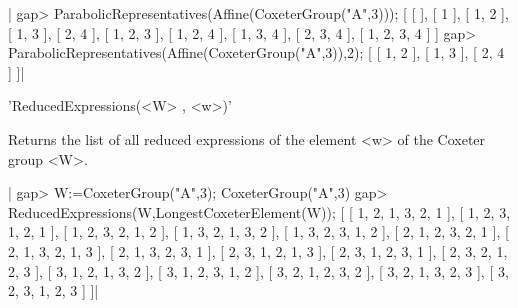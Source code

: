 |    gap> ParabolicRepresentatives(Affine(CoxeterGroup("A",3)));
    [ [  ], [ 1 ], [ 1, 2 ], [ 1, 3 ], [ 2, 4 ], [ 1, 2, 3 ],
      [ 1, 2, 4 ], [ 1, 3, 4 ], [ 2, 3, 4 ], [ 1, 2, 3, 4 ] ]
    gap> ParabolicRepresentatives(Affine(CoxeterGroup("A",3)),2);
    [ [ 1, 2 ], [ 1, 3 ], [ 2, 4 ] ]|


'ReducedExpressions(<W> , <w>)'

Returns  the list  of all  reduced expressions  of the  element <w>  of the
Coxeter group <W>.

|    gap> W:=CoxeterGroup("A",3);
    CoxeterGroup("A",3)
    gap> ReducedExpressions(W,LongestCoxeterElement(W));
    [ [ 1, 2, 1, 3, 2, 1 ], [ 1, 2, 3, 1, 2, 1 ], [ 1, 2, 3, 2, 1, 2 ],
      [ 1, 3, 2, 1, 3, 2 ], [ 1, 3, 2, 3, 1, 2 ], [ 2, 1, 2, 3, 2, 1 ],
      [ 2, 1, 3, 2, 1, 3 ], [ 2, 1, 3, 2, 3, 1 ], [ 2, 3, 1, 2, 1, 3 ],
      [ 2, 3, 1, 2, 3, 1 ], [ 2, 3, 2, 1, 2, 3 ], [ 3, 1, 2, 1, 3, 2 ],
      [ 3, 1, 2, 3, 1, 2 ], [ 3, 2, 1, 2, 3, 2 ], [ 3, 2, 1, 3, 2, 3 ],
      [ 3, 2, 3, 1, 2, 3 ] ]|

